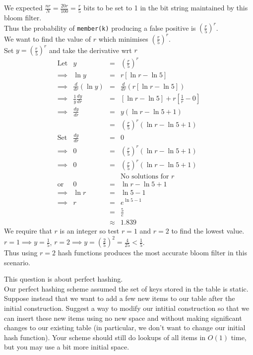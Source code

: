 \documentclass[11pt,a4paper]{article}
\begin{document}
\ans
We expected $\frac{nr}N=\frac{20 r}{100}=\frac{r}5$ bits to be set to 1 in the bit string maintained by this bloom filter.\\
Thus the probability of \lstinline!member(k)! producing a false positive is $\left(\frac{r}5\right)^r$.\\
We want to find the value of $r$ which minimises $\left(\frac{r}5\right)^r$.\\
Set $y=\left(\frac{r}5\right)^r$ and take the derivative wrt $r$
\[\begin{array}{rrcl}
\text{Let}&y&=&\left(\frac{r}5\right)^r\\
\implies&\ln y&=&r[\ln r-\ln5]\\
\implies&\frac{d}{dr}(\ln y)&=&\frac{d}{dr}(r[\ln r-\ln5])\\
\implies&\frac1y\frac{dy}{dr}&=&[\ln r-\ln5]+r[\frac1r-0]\\
\implies&\frac{dy}{dr}&=&y(\ln r-\ln 5+1)\\
&&=&\left(\frac{r}5\right)^r(\ln r-\ln 5+1)\\
\text{Set}&\frac{dy}{dr}&=&0\\
\implies&0&=&\left(\frac{r}5\right)^r(\ln r-\ln 5+1)\\
\implies&0&=&\left(\frac{r}5\right)^r(\ln r-\ln 5+1)\\
&&&\text{No solutions for }r\\
\text{or}&0&=&\ln r-\ln 5+1\\
\implies&\ln r&=&\ln5-1\\
\implies&r&=&e^{\ln 5-1}\\
&&=&\frac{5}{e}\\
&&\approx&1.839
\end{array}\]
We require that $r$ is an integer so test $r=1$ and $r=2$ to find the lowest value.\\
$r=1\implies y=\frac15$, $r=2\implies y=\left(\frac25\right)^2=\frac4{25}<\frac15$.\\
Thus using $r=2$ hash functions produces the most accurate bloom filter in this scenario.

\question
This question is about perfect hashing.\\

\qpart
Our perfect hashing scheme assumed the set of keys stored in the table is static. Suppose instead that we want to add a few new items to our table after the initial construction. Suggest a way to modify our intitial construction so that we can insert these new items using no new space and without making significant changes to our existing table (in particular, we don’t want to change our initial hash function). Your scheme should still do lookups of all items in $O(1)$ time, but you may use a bit more initial space.\\
\end{document}
